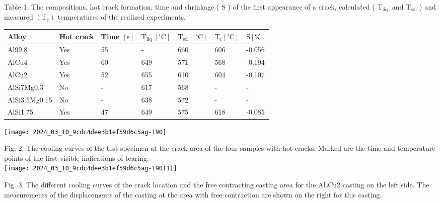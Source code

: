 \documentclass[10pt]{article}
\begin{document}
Table 1. The compositions, hot crack formation, time and shrinkage ( $\mathrm{S}$ ) of the first appearance of a crack, calculated ( $\mathrm{T}_{\text {liq }}$ and $\mathrm{T}_{\mathrm{sol}}$ ) and measured $\left(\mathrm{T}_{\mathrm{c}}\right)$ temperatures of the realized experiments.

\begin{center}
\begin{tabular}{l|l|l|l|l|l|l}
\hline
Alloy & Hot crack & Time $[\mathrm{s}]$ & $\mathrm{T}_{\text {liq }}\left[{ }^{\circ} \mathrm{C}\right]$ & $\mathrm{T}_{\text {sol }}\left[{ }^{\circ} \mathrm{C}\right]$ & $\mathrm{T}_{\mathrm{c}}\left[{ }^{\circ} \mathrm{C}\right]$ & $\mathrm{S}[\%]$ \\
\hline
$\mathrm{Al} 99.8$ & Yes & 55 & - & 660 & 606 & -0.056 \\
\hline
$\mathrm{AlCu} 4$ & Yes & 60 & 649 & 571 & 568 & -0.194 \\
\hline
$\mathrm{AlCu} 2$ & Yes & 52 & 655 & 610 & 604 & -0.107 \\
\hline
AlSi7Mg0.3 & No & - & 617 & 568 & - & - \\
\hline
AlSi3.5Mg0.15 & No & - & 638 & 572 & - & - \\
\hline
AlSi1.75 & Yes & 47 & 649 & 575 & 618 & -0.085 \\
\hline
\end{tabular}
\end{center}

\begin{center}
\texttt{[image: 2024\_03\_10\_9cdc4dee3b1ef59d6c5ag-190]}
\end{center}

Fig. 2. The cooling curves of the test specimen at the crack area of the four samples with hot cracks. Marked are the time and temperature points of the first visible indications of tearing.\\
\texttt{[image: 2024\_03\_10\_9cdc4dee3b1ef59d6c5ag-190(1)]}

Fig. 3. The different cooling curves of the crack location and the free contracting casting area for the ALCu2 casting on the left side. The measurements of the displacements of the casting at the area with free contraction are shown on the right for this casting.
\end{document}
